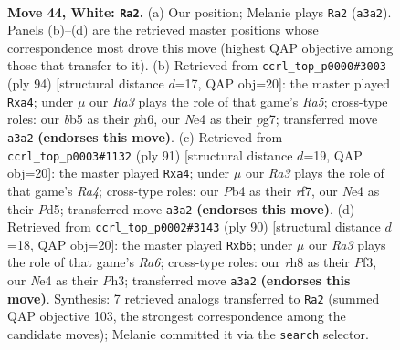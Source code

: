 \documentclass[11pt]{article}
\begin{document}
\clearpage

\begin{figure}[p]\centering
\begin{subfigure}{0.46\textwidth}\centering
\resizebox{\linewidth}{!}{%
\newchessgame
\chessboard[
  setfen={7r/4k3/8/1b2p3/pP2N3/R5P1/6K1/8 w - - 1 44},
  showmover=false,
  pgfstyle=straightmove, color=movearrow, markmove={a3-a2}
]}
\caption{}
\end{subfigure}\hfill
\begin{subfigure}{0.46\textwidth}\centering
\resizebox{\linewidth}{!}{%
\newchessgame
\chessboard[
  setfen={7k/6p1/7p/R6P/p7/5PPK/1r6/8 w - - 0 48},
  showmover=false,
  pgfstyle=straightmove, color=movearrow, markmove={a5-a4}
]}
\caption{}
\end{subfigure}
\\[4pt]
\begin{subfigure}{0.46\textwidth}\centering
\resizebox{\linewidth}{!}{%
\newchessgame
\chessboard[
  setfen={8/5R2/8/r2p3p/P6k/2K5/P7/8 b - - 3 46},
  showmover=false,
  pgfstyle=straightmove, color=movearrow, markmove={a5-a4}
]}
\caption{}
\end{subfigure}\hfill
\begin{subfigure}{0.46\textwidth}\centering
\resizebox{\linewidth}{!}{%
\newchessgame
\chessboard[
  setfen={3r4/5pk1/Rp6/7p/5K2/5P1P/P7/8 w - - 1 46},
  showmover=false,
  pgfstyle=straightmove, color=movearrow, markmove={a6-b6}
]}
\caption{}
\end{subfigure}
\caption{\textbf{Move 44, White: \texttt{Ra2}.} (a) Our position; Melanie plays \texttt{Ra2} (\texttt{a3a2}). Panels (b)--(d) are the retrieved master positions whose correspondence most drove this move (highest QAP objective among those that transfer to it). (b) Retrieved from \texttt{ccrl\_top\_p0000\#3003} (ply 94) [structural distance $d$=17, QAP obj=20]: the master played \texttt{Rxa4}; under $\mu$ our \emph{Ra3} plays the role of that game's \emph{Ra5}; cross-type roles: our \emph{b}b5 as their \emph{p}h6, our \emph{N}e4 as their \emph{p}g7; transferred move \texttt{a3a2} \textbf{(endorses this move)}. (c) Retrieved from \texttt{ccrl\_top\_p0003\#1132} (ply 91) [structural distance $d$=19, QAP obj=20]: the master played \texttt{Rxa4}; under $\mu$ our \emph{Ra3} plays the role of that game's \emph{Ra4}; cross-type roles: our \emph{P}b4 as their \emph{r}f7, our \emph{N}e4 as their \emph{P}d5; transferred move \texttt{a3a2} \textbf{(endorses this move)}. (d) Retrieved from \texttt{ccrl\_top\_p0002\#3143} (ply 90) [structural distance $d$=18, QAP obj=20]: the master played \texttt{Rxb6}; under $\mu$ our \emph{Ra3} plays the role of that game's \emph{Ra6}; cross-type roles: our \emph{r}h8 as their \emph{P}f3, our \emph{N}e4 as their \emph{P}h3; transferred move \texttt{a3a2} \textbf{(endorses this move)}. Synthesis: 7 retrieved analogs transferred to \texttt{Ra2} (summed QAP objective 103, the strongest correspondence among the candidate moves); Melanie committed it via the \texttt{search} selector.}
\label{fig:thought-m86}
\end{figure}
\end{document}
